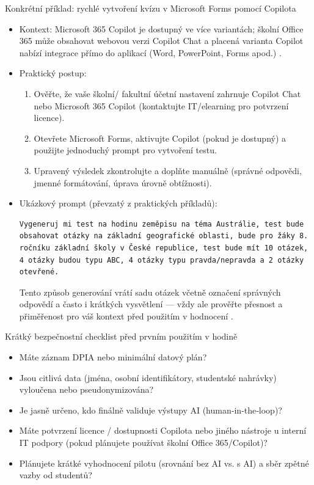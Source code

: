 \documentclass{report}%
\begin{document}
Konkrétní příklad: rychlé vytvoření kvízu v Microsoft Forms pomocí Copilota
\begin{itemize}
  \item Kontext: Microsoft 365 Copilot je dostupný ve více variantách; školní Office 365 může obsahovat webovou verzi Copilot Chat a placená varianta Copilot nabízí integrace přímo do aplikací (Word, PowerPoint, Forms apod.) \cite{kb_ai_101_tipu_pdf_04e4a115_page_3_1}.
  \item Praktický postup:
    \begin{enumerate}
      \item Ověřte, že vaše školní/ fakultní účetní nastavení zahrnuje Copilot Chat nebo Microsoft 365 Copilot (kontaktujte IT/elearning pro potvrzení licence).
      \item Otevřete Microsoft Forms, aktivujte Copilot (pokud je dostupný) a použijte jednoduchý prompt pro vytvoření testu.
      \item Upravený výsledek zkontrolujte a doplňte manuálně (správné odpovědi, jmenné formátování, úprava úrovně obtížnosti).
    \end{enumerate}
  \item Ukázkový prompt (převzatý z praktických příkladů): 
\begin{verbatim}
Vygeneruj mi test na hodinu zeměpisu na téma Austrálie, test bude obsahovat otázky na základní geografické oblasti, bude pro žáky 8. ročníku základní školy v České republice, test bude mít 10 otázek, 4 otázky budou typu ABC, 4 otázky typu pravda/nepravda a 2 otázky otevřené.
\end{verbatim}
Tento způsob generování vrátí sadu otázek včetně označení správných odpovědí a často i krátkých vysvětlení — vždy ale prověřte přesnost a přiměřenost pro váš kontext před použitím v hodnocení \cite{kb_ai_101_tipu_pdf_04e4a115_page_36_1}.
\end{itemize}

Krátký bezpečnostní checklist před prvním použitím v hodině
\begin{itemize}
  \item Máte záznam DPIA nebo minimální datový plán? \cite{kb_malinka_chatgpt_ve_vyuce_dva_roky_pote_2024_pdf_90bc3aaf_page_12_1}
  \item Jsou citlivá data (jména, osobní identifikátory, studentské nahrávky) vyloučena nebo pseudonymizována? \cite{kb_malinka_chatgpt_ve_vyuce_dva_roky_pote_2024_pdf_90bc3aaf_page_12_1}
  \item Je jasně určeno, kdo finálně validuje výstupy AI (human‑in‑the‑loop)? \cite{kb_malinka_chatgpt_ve_vyuce_dva_roky_pote_2024_pdf_90bc3aaf_page_12_1}
  \item Máte potvrzení licence / dostupnosti Copilota nebo jiného nástroje u interní IT podpory (pokud plánujete používat školní Office 365/Copilot)? \cite{kb_ai_101_tipu_pdf_04e4a115_page_3_1}
  \item Plánujete krátké vyhodnocení pilotu (srovnání bez AI vs. s AI) a sběr zpětné vazby od studentů?
\end{itemize}
\end{document}
